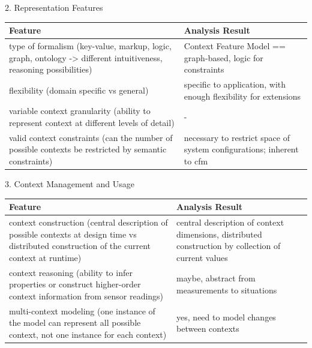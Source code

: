 2. Representation Features \\
\newline
\begin{tabularx}{\textwidth}{|X|X|}
\hline
\textbf{Feature} & \textbf{Analysis Result} \\
\hline 
type of formalism (key-value, markup, logic, graph, ontology -> different intuitiveness, reasoning possibilities)  & Context Feature Model == graph-based, logic for constraints \\ 
\hline 
flexibility (domain specific vs general)  & specific to application, with enough flexibility for extensions \\ 
\hline 
variable context granularity (ability to represent context at different levels of detail) & - \\ 
\hline 
valid context constraints (can the number of possible contexts be restricted by semantic constraints) & necessary to restrict space of system configurations; inherent to \gls{cfm} \\ 
\hline 
\end{tabularx} 
 
 3. Context Management and Usage \\
\newline
\begin{tabularx}{\textwidth}{|X|X|}
\hline
\textbf{Feature} & \textbf{Analysis Result} \\
\hline 
context construction (central description of possible contexts at design time vs distributed construction of the current context at runtime) &  central description of context dimensions, distributed construction by collection of current values \\ 
\hline 
context reasoning (ability to infer properties or construct higher-order context information from sensor readings) & maybe, abstract from measurements to situations \\ 
\hline 
multi-context modeling (one instance of the model can represent all possible context, not one instance for each context) & yes, need to model changes between contexts \\ 
\hline 
\end{tabularx} 

